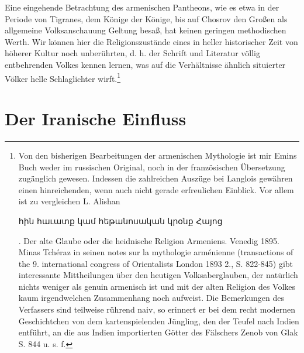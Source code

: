 \documentclass{article}
\begin{document}
Eine eingehende Betrachtung des armenischen Pantheons, wie es etwa in der Periode von Tigranes, dem Könige der Könige, bis auf Chosrov den Großen als allgemeine Volksanschauung Geltung besaß, hat keinen geringen methodischen Werth. Wir können hier die Religionszustände eines in heller historischer Zeit von höherer Kultur noch unberührten, d. h. der Schrift und Literatur völlig entbehrenden Volkes kennen lernen, was auf die Verhältnisse ähnlich situierter Völker helle Schlaglichter wirft.\footnote{Von den bisherigen Bearbeitungen der armenischen Mythologie ist mir Emins Buch weder im russischen Original, noch in der französischen Übersetzung zugänglich gewesen. Indessen die zahlreichen Auszüge bei Langlois gewähren einen hinreichenden, wenn auch nicht gerade erfreulichen Einblick. Vor allem ist zu vergleichen L. Alishan \begin{armenian}հին հաւատք կամ հեթանոսական կրօնք Հայոց\end{armenian}. Der alte Glaube oder die heidnische Religion Armeniens. Venedig 1895. Minas Tchéraz in seinen notes sur la mythologie arménienne (transactions of the 9. international congress of Orientalists London 1893 2., S. 822-845) gibt interessante Mittheilungen über den heutigen Volksaberglauben, der natürlich nichts weniger als genuin armenisch ist und mit der alten Religion des Volkes kaum irgendwelchen Zusammenhang noch aufweist. Die Bemerkungen des Verfassers sind teilweise rührend naiv, so erinnert er bei dem recht modernen Geschichtchen von dem kartenspielenden Jüngling, den der Teufel nach Indien entführt, an die aus Indien importierten Götter des Fälschers Zenob von Glak S. 844 u. s. f.}
\clearpage
\large
\section{Der Iranische Einfluss}
\end{document}
